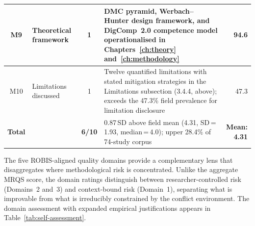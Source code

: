 \begin{table}[!h]
\begin{tabular}{clcp{6.5cm}r}
\hline
M9 & Theoretical framework & 1 & DMC pyramid, Werbach--Hunter design framework, and DigComp~2.0 competence model operationalised in Chapters~\ref{ch:theory} and~\ref{ch:methodology} & 94.6 \\
\hline
M10 & Limitations discussed & 1 & Twelve quantified limitations with stated mitigation strategies in the Limitations subsection (3.4.4, above); exceeds the 47.3\% field prevalence for limitation disclosure & 47.3 \\
\hline
\textbf{Total} & & \textbf{6/10} & 0.87\,SD above field mean (4.31, SD\,=\,1.93, median\,=\,4.0); upper 28.4\% of 74-study corpus & \textbf{Mean: 4.31} \\
\hline
\end{tabular}
\end{table}

The five ROBIS-aligned quality domains \cite{Whiting2016, Wells2014} provide a complementary
lens that disaggregates where methodological risk is concentrated. Unlike the aggregate MRQS
score, the domain ratings distinguish between researcher-controlled risk (Domains~2 and~3)
and context-bound risk (Domain~1), separating what is improvable from what is irreducibly
constrained by the conflict environment. The domain assessment with expanded empirical
justifications appears in Table~\ref{tab:self-assessment}.

